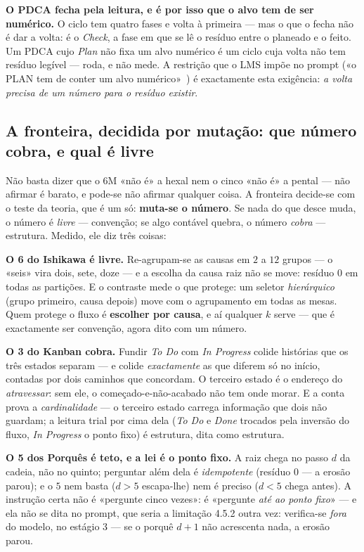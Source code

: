 \documentclass[11pt,a4paper]{article}
\begin{document}
\smallskip
\noindent \textbf{O PDCA fecha pela leitura, e é por isso que o alvo tem de ser numérico.} O ciclo tem
quatro fases e volta à primeira --- mas o que o fecha não é dar a volta: é o \emph{Check}, a fase em que
se lê o resíduo entre o planeado e o feito. Um PDCA cujo \emph{Plan} não fixa um alvo numérico é um
ciclo cuja volta não tem resíduo legível --- roda, e não mede. A restrição que o LMS impõe no prompt
(«o PLAN tem de conter um alvo numérico»~\cite{lms}) é exactamente esta exigência: \emph{a volta
precisa de um número para o resíduo existir}.

\subsection*{A fronteira, decidida por mutação: que número cobra, e qual é livre}

Não basta dizer que o 6M «não é» a hexal nem o cinco «não é» a pental --- não afirmar é barato, e
pode-se não afirmar qualquer coisa. A fronteira decide-se com o teste da teoria, que é um só:
\textbf{muta-se o número}. Se nada do que desce muda, o número é \emph{livre} --- convenção; se algo
contável quebra, o número \emph{cobra} --- estrutura. Medido, ele diz três coisas:

\smallskip
\noindent \textbf{O 6 do Ishikawa é livre.} Re-agrupam-se as causas em $2$ a $12$ grupos --- o «seis»
vira dois, sete, doze --- e a escolha da causa raiz não se move: resíduo $0$ em todas as partições. E
o contraste mede o que protege: um seletor \emph{hierárquico} (grupo primeiro, causa depois) move com
o agrupamento em todas as mesas. Quem protege o fluxo é \textbf{escolher por causa}, e aí qualquer
$k$ serve --- que é exactamente ser convenção, agora dito com um número.

\smallskip
\noindent \textbf{O 3 do Kanban cobra.} Fundir \emph{To Do} com \emph{In Progress} colide histórias
que os três estados separam --- e colide \emph{exactamente} as que diferem só no início, contadas por
dois caminhos que concordam. O terceiro estado é o endereço do \emph{atravessar}: sem ele, o
começado-e-não-acabado não tem onde morar. E a conta prova a \emph{cardinalidade} --- o terceiro estado
carrega informação que dois não guardam; a leitura trial por cima dela (\emph{To Do} e \emph{Done}
trocados pela inversão do fluxo, \emph{In Progress} o ponto fixo) é estrutura, dita como estrutura.

\smallskip
\noindent \textbf{O 5 dos Porquês é teto, e a lei é o ponto fixo.} A raiz chega no passo $d$ da
cadeia, não no quinto; perguntar além dela é \emph{idempotente} (resíduo $0$ --- a erosão parou); e o
$5$ nem basta ($d>5$ escapa-lhe) nem é preciso ($d<5$ chega antes). A instrução certa não é «pergunte
cinco vezes»: é «pergunte \emph{até ao ponto fixo}» --- e ela não se dita no prompt, que seria a
limitação 4.5.2 outra vez: verifica-se \emph{fora} do modelo, no estágio 3 --- se o porquê $d{+}1$ não
acrescenta nada, a erosão parou.
\end{document}
